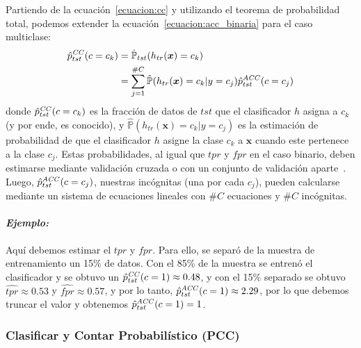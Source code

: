 Partiendo de la ecuación~\ref{ecuacion:cc} y utilizando el teorema de
probabilidad total, podemos extender la ecuación~\ref{ecuacion:acc_binaria} para
el caso multiclase:
\begin{align}
\begin{split}
    \hat p^{\it CC\/}_{tst}(c=c_k) &= \mathbb{\hat P}_{tst}(h_{tr}(\boldsymbol{x})=c_k) \\
    &= \sum \limits_{j=1}^{\#C}{\mathbb{\hat P}(h_{tr}(\boldsymbol{x})=c_k|y=c_j) \hat p^{\it ACC\/}_{tst}(c=c_j)}\label{ecuacion:acc_multiclase}
\end{split}
\end{align}
donde $\hat p^{\it CC\/}_{tst}(c=c_k)$ es la fracción de datos de $tst$ que el
clasificador $h$ asigna a $c_k$ (y por ende, es conocido), y
$\mathbb{\hat{P}}(h_{tr}(\boldsymbol{x})=c_k|y=c_j)$ es la estimación de
probabilidad de que el clasificador $h$ asigne la clase $c_k$ a $\boldsymbol{x}$
cuando este pertenece a la clase $c_j$. Estas probabilidades, al igual que $tpr$
y $fpr$ en el caso binario, deben estimarse mediante validación cruzada o con un
conjunto de validación aparte~\cite{barranquero2013study, forman2005counting,
forman2008quantifying}. Luego, $\hat p^{\it ACC\/}_{tst}(c=c_j)$, nuestras
incógnitas (una por cada $c_j$), pueden calcularse mediante un sistema de
ecuaciones lineales con $\#C$ ecuaciones y $\#C$ incógnitas.

\paragraph{\it Ejemplo:\/} Aquí debemos estimar el $tpr$ y $fpr$. Para ello, se
separó de la muestra de entrenamiento un 15\% de datos. Con el 85\% de la
muestra se entrenó el clasificador y se obtuvo un $\hat p^{\it CC\/}_{tst}(c=1)
\approx 0.48$, y con el 15\% separado se obtuvo $\hat{tpr} \approx 0.53$ y
$\hat{fpr} \approx 0.57$, y por lo tanto, $\hat p^{\it ACC\/}_{tst}(c=1) \approx
2.29$, por lo que debemos truncar el valor y obtenemos $\hat p^{\it
ACC\/}_{tst}(c=1)=1$.

\subsubsection{Clasificar y Contar Probabilístico (PCC)}\label{puntual:pcc}

